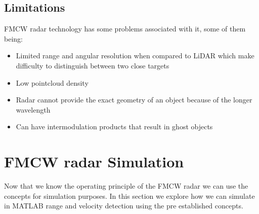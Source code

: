  
\subsection{Limitations}
\ac{FMCW} {radar} technology has some problems associated with it, some of them being:
\begin{itemize}
\item{Limited range and angular resolution when compared to \ac{LiDAR} which make difficulty to distinguish between two close targets}  
\item{Low pointcloud density}  
\item{Radar cannot provide the exact geometry of an object because of the longer wavelength}  
\item{Can have intermodulation products that result in ghost objects} 
\end{itemize}

\section{FMCW radar Simulation}
Now that we know the operating principle of the \ac{FMCW} \ac{radar} we can use the concepts for simulation purposes. In this section we explore how we can simulate in MATLAB range and velocity detection using the pre established concepts. 
